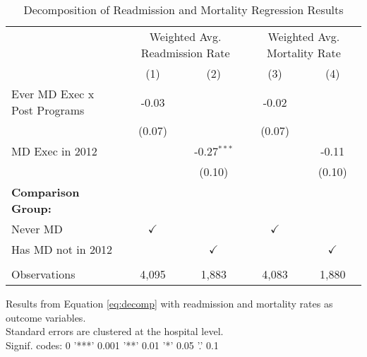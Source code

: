 \begin{table}[ht!]
   \caption{\label{tab:MD_noMD_readmort_decomp_fullsample} Decomposition of Readmission and Mortality Regression Results}
   \bigskip
   \centering
   \begin{tabular}{lcccc}
      \toprule
       & \multicolumn{2}{c}{Weighted Avg. Readmission Rate} & \multicolumn{2}{c}{Weighted Avg. Mortality Rate}\\
                                   & (1)           & (2)           & (3)           & (4)\\  
      \midrule 
      Ever MD Exec x Post Programs & -0.03         &               & -0.02         &   \\   
                                   & (0.07)        &               & (0.07)        &   \\   
      MD Exec in 2012              &               & -0.27$^{***}$ &               & -0.11\\   
                                   &               & (0.10)        &               & (0.10)\\   
      \textbf{Comparison Group:}   &               &               &               & \\  
      Never MD                     & $\checkmark$  &               & $\checkmark$  &  \\  
      Has MD not in 2012           &               & $\checkmark$  &               & $\checkmark$\\   
       \\
      Observations                 & 4,095         & 1,883         & 4,083         & 1,880\\  
      \bottomrule
   \end{tabular}
   
   \par \raggedright 
   Results from Equation \ref{eq:decomp} with readmission and mortality rates as outcome variables.\\
   Standard errors are clustered at the hospital level.\\
   Signif. codes: 0 '***' 0.001 '**' 0.01 '*' 0.05 '.' 0.1
\end{table}
